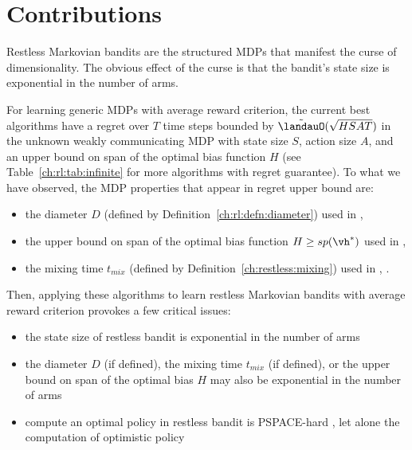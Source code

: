 \section{Contributions}
\label{ch:restless:contribute}

Restless Markovian bandits are the structured MDPs that manifest the curse of dimensionality.
The obvious effect of the curse is that the bandit's state size is exponential in the number of arms.

For learning generic MDPs with average reward criterion, the current best algorithms have a regret over $T$ time steps bounded by $\tilde{\landauO}(\sqrt{HSAT})$ in the unknown weakly communicating MDP with state size $S$, action size $A$, and an upper bound on span of the optimal bias function $H$ (see Table~\ref{ch:rl:tab:infinite} for more algorithms with regret guarantee).
To what we have observed, the MDP properties that appear in regret upper bound are:
\begin{itemize}
    \item the diameter $D$ (defined by Definition~\ref{ch:rl:defn:diameter}) used in \eg, \cite{jaksch2010near, fruit2020improved, tossou2019near}
    \item the upper bound on span of the optimal bias function $H\ge sp(\vh^*)$ used in \eg, \cite{bartlett2012regal, ouyang2017learning, fruit2018efficient, zhang2019regret}
    \item the mixing time $t_{mix}$ (defined by Definition~\ref{ch:restless:mixing}) used in \eg, \cite{ortner2020regret}.
\end{itemize}
Then, applying these algorithms to learn restless Markovian bandits with average reward criterion provokes a few critical issues:
\begin{itemize}
    \item the state size of restless bandit is exponential in the number of arms
    \item the diameter $D$ (if defined), the mixing time $t_{mix}$ (if defined), or the upper bound on span of the optimal bias $H$ may also be exponential in the number of arms
    \item compute an optimal policy in restless bandit is PSPACE-hard \cite{papadimitriou1994complexity}, let alone the computation of optimistic policy
\end{itemize}
